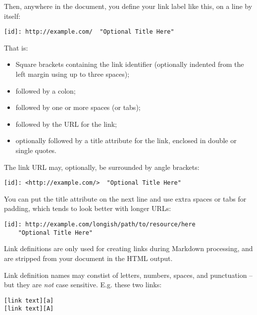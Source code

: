 Then, anywhere in the document, you define your link label like this,
on a line by itself:

\begin{lstlisting}
[id]: http://example.com/  "Optional Title Here"
\end{lstlisting}




That is:

\begin{itemize}
\item Square brackets containing the link identifier (optionally
indented from the left margin using up to three spaces);
\item followed by a colon;
\item followed by one or more spaces (or tabs);
\item followed by the URL for the link;
\item optionally followed by a title attribute for the link, enclosed
in double or single quotes.
\end{itemize}




The link URL may, optionally, be surrounded by angle brackets:

\begin{lstlisting}
[id]: <http://example.com/>  "Optional Title Here"
\end{lstlisting}




You can put the title attribute on the next line and use extra spaces
or tabs for padding, which tends to look better with longer URLs:

\begin{lstlisting}
[id]: http://example.com/longish/path/to/resource/here
    "Optional Title Here"
\end{lstlisting}




Link definitions are only used for creating links during Markdown
processing, and are stripped from your document in the HTML output.



Link definition names may constist of letters, numbers, spaces, and punctuation -- but they are \emph{not} case sensitive. E.g. these two links:

\begin{lstlisting}
[link text][a]
[link text][A]
\end{lstlisting}





